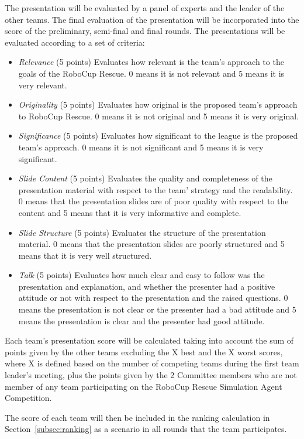 \documentclass{article}
\begin{document}
The presentation will be evaluated by a panel of experts and the leader of the other teams. The final evaluation of the presentation will be incorporated into the score of the preliminary, semi-final and final rounds. The presentations will be evaluated according to a set of criteria:
\begin{itemize}
\item \emph{Relevance} (5 points) Evaluates how relevant is the team's approach to the goals of the RoboCup Rescue. 0 means it is not relevant and 5 means it is very relevant.
\item \emph{Originality} (5 points) Evaluates how original is the proposed team's approach to RoboCup Rescue. 0 means it is not original and 5 means it is very original.
\item \emph{Significance} (5 points) Evaluates how significant to the league is the proposed team's approach. 0 means it is not significant and 5 means it is very significant.
\item \emph{Slide Content} (5 points) Evaluates the quality and completeness of the presentation material with respect to the team' strategy and the readability. 0 means that the presentation slides are of poor quality with respect to the content and 5 means that it is very informative and complete.
\item \emph{Slide Structure} (5 points) Evaluates the structure of the presentation material. 0 means that the presentation slides are poorly structured and 5 means that it is very well structured.
\item \emph{Talk} (5 points) Evaluates how much clear and easy to follow was the presentation and explanation, and whether the presenter had a positive attitude or not with respect to the presentation and the raised questions. 0 means the presentation is not clear or the presenter had a bad attitude and 5 means the presentation is clear and the presenter had good attitude.
\end{itemize}

Each team's presentation score will be calculated taking into account the sum of points given by the other teams excluding the X best and the X worst scores, where X is defined based on the number of competing teams during the first team leader's meeting, plus the points given by the 2 Committee members who are not member of any team participating on the RoboCup Rescue Simulation Agent Competition.

The score of each team will then be included in the ranking calculation in Section~\ref{subsec:ranking} as a scenario in all rounds that the team participates.
\end{document}
